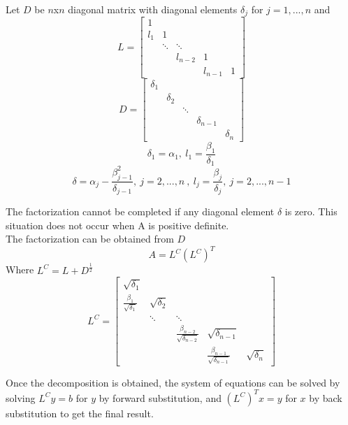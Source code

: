 \documentclass[12pt]{article}
\begin{document}
Let $D$ be $n$x$n$ diagonal matrix with diagonal elements $\delta_j$ for $j = 1,...,n$ and
$$
L= \left[
\begin{array}{ccccc}
1 &  &  & & \\
l_1 & 1 &   & & \\
  &\ddots&\ddots& &  \\
 &  & l_{n-2} & 1 &  \\
  &  &   & l_{n-1} & 1
\end{array}
\right]
$$
$$
D= \left[
\begin{array}{ccccc}
\delta_1 &  &  & & \\
 & \delta_2 &   & & \\
  & &\ddots& &  \\
 &  &  & \delta_{n-1} &  \\
  &  &   &  & \delta_n
\end{array}
\right]
$$
$$\delta_1=\alpha_1, \ l_1=\frac{\beta_1}{\delta_1}$$
$$\delta=\alpha_j-\frac{\beta_{j-1}^2}{\delta_{j-1}},\ j=2,...,n\ ,\ l_j=\frac{\beta_j}{\delta_j},\ j=2,...,n-1$$

The factorization cannot be completed if any diagonal element $\delta$ is zero. This situation does not occur when A is positive definite.\\

The factorization can be obtained from $D$
$$
A = L^C(L^C)^T
$$
Where $L^C=L+D^{\frac{1}{2}}$
$$
L^C = \left[
\begin{array}{ccccc}
\sqrt{\delta_1} &  &  & & \\
\frac{\beta_1}{\sqrt{\delta_1}} & \sqrt{\delta_2} &   & & \\
  &\ddots&\ddots& &  \\
 &  & \frac{\beta_{n-2}}{\sqrt{\delta_{n-2}}} & \sqrt{\delta_{n-1}} &  \\
  &  &   & \frac{\beta_{n-1}}{\sqrt{\delta_{n-1}}} & \sqrt{\delta_n}
\end{array}
\right]
$$

Once the decomposition is obtained, the system of equations can be solved by solving $L^Cy=b$ for $y$ by forward substitution, and $(L^C)^Tx=y$ for $x$ by back substitution to get the final result.                  
\end{document}
